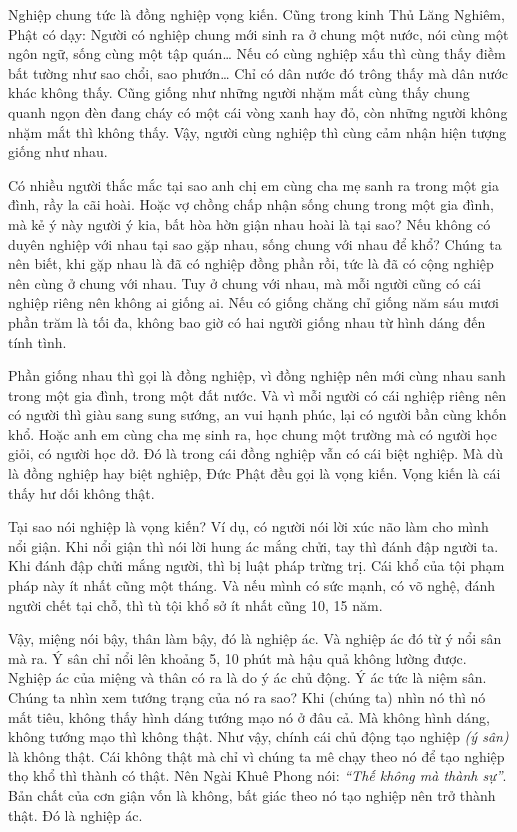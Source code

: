 \documentclass[
  12pt,
  oneside]{book}
\begin{document}
Nghiệp chung tức là đồng nghiệp vọng kiến. Cũng trong kinh Thủ Lăng Nghiêm, Phật có dạy: Người có nghiệp chung mới sinh ra ở chung một nước, nói cùng một ngôn ngữ, sống cùng một tập quán\ldots{} Nếu có cùng nghiệp xấu thì cùng thấy điềm bất tường như sao chổi, sao phướn\ldots{} Chỉ có dân nước đó trông thấy mà dân nước khác không thấy. Cũng giống như những người nhặm mắt cùng thấy chung quanh ngọn đèn đang cháy có một cái vòng xanh hay đỏ, còn những người không nhặm mắt thì không thấy. Vậy, người cùng nghiệp thì cùng cảm nhận hiện tượng giống như nhau.

Có nhiều người thắc mắc tại sao anh chị em cùng cha mẹ sanh ra trong một gia đình, rầy la cãi hoài. Hoặc vợ chồng chấp nhận sống chung trong một gia đình, mà kẻ ý này người ý kia, bất hòa hờn giận nhau hoài là tại sao? Nếu không có duyên nghiệp với nhau tại sao gặp nhau, sống chung với nhau để khổ? Chúng ta nên biết, khi gặp nhau là đã có nghiệp đồng phần rồi, tức là đã có cộng nghiệp nên cùng ở chung với nhau. Tuy ở chung với nhau, mà mỗi người cũng có cái nghiệp riêng nên không ai giống ai. Nếu có giống chăng chỉ giống năm sáu mươi phần trăm là tối đa, không bao giờ có hai người giống nhau từ hình dáng đến tính tình.

Phần giống nhau thì gọi là đồng nghiệp, vì đồng nghiệp nên mới cùng nhau sanh trong một gia đình, trong một đất nước. Và vì mỗi người có cái nghiệp riêng nên có người thì giàu sang sung sướng, an vui hạnh phúc, lại có người bần cùng khốn khổ. Hoặc anh em cùng cha mẹ sinh ra, học chung một trường mà có người học giỏi, có người học dở. Đó là trong cái đồng nghiệp vẫn có cái biệt nghiệp. Mà dù là đồng nghiệp hay biệt nghiệp, Đức Phật đều gọi là vọng kiến. Vọng kiến là cái thấy hư dối không thật.

Tại sao nói nghiệp là vọng kiến? Ví dụ, có người nói lời xúc não làm cho mình nổi giận. Khi nổi giận thì nói lời hung ác mắng chửi, tay thì đánh đập người ta. Khi đánh đập chửi mắng người, thì bị luật pháp trừng trị. Cái khổ của tội phạm pháp này ít nhất cũng một tháng. Và nếu mình có sức mạnh, có võ nghệ, đánh người chết tại chỗ, thì tù tội khổ sở ít nhất cũng 10, 15 năm.

Vậy, miệng nói bậy, thân làm bậy, đó là nghiệp ác. Và nghiệp ác đó từ ý nổi sân mà ra. Ý sân chỉ nổi lên khoảng 5, 10 phút mà hậu quả không lường được. Nghiệp ác của miệng và thân có ra là do ý ác chủ động. Ý ác tức là niệm sân. Chúng ta nhìn xem tướng trạng của nó ra sao? Khi (chúng ta) nhìn nó thì nó mất tiêu, không thấy hình dáng tướng mạo nó ở đâu cả. Mà không hình dáng, không tướng mạo thì không thật. Như vậy, chính cái chủ động tạo nghiệp \emph{(ý sân)} là không thật. Cái không thật mà chỉ vì chúng ta mê chạy theo nó để tạo nghiệp thọ khổ thì thành có thật. Nên Ngài Khuê Phong nói: \emph{``Thế không mà thành sự''}. Bản chất của cơn giận vốn là không, bất giác theo nó tạo nghiệp nên trở thành thật. Đó là nghiệp ác.
\end{document}
